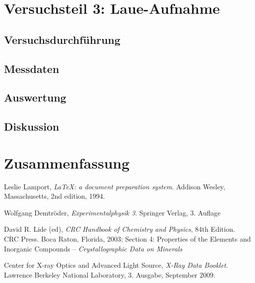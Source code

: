 \documentclass[10pt, a4paper]{article}
\begin{document}
\section{Versuchsteil 3: Laue-Aufnahme}
\subsection{Versuchsdurchführung}
\subsection{Messdaten}
\subsection{Auswertung}
\subsection{Diskussion}


\section{Zusammenfassung}

\begin{figure}
\centering

\end{figure}

\begin{figure}
\centering

\end{figure}


\begin{thebibliography}{9}

  Leslie Lamport,
  \emph{\LaTeX: a document preparation system}.
  Addison Wesley, Massachusetts,
  2nd edition,
  1994.

	Wolfgang Demtröder,
	\emph{Experimentalphysik 3}.
	Springer Verlag,
	3. Auflage

  David R. Lide (ed),
  \emph{CRC Handbook of Chemistry and Physics},
  84th Edition. CRC Press. Boca Raton, Florida, 2003;
  Section 4: Properties of the Elements and Inorganic Compounds --
  \emph{Crystallographic Data on Minerals}

  Center for X-ray Optics and Advanced Light Source,
  \emph{X-Ray Data Booklet}.
  Lawrence Berkeley National Laboratory,
  3. Ausgabe,
  September 2009.
\end{thebibliography}

\newpage

\begin{appendix}

\end{appendix}
\end{document}
